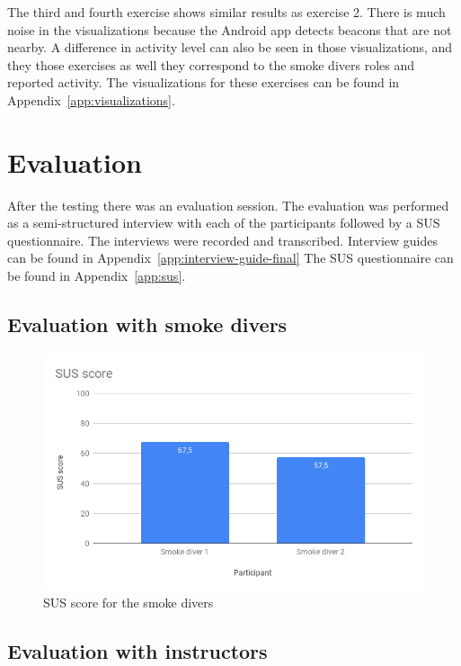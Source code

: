 \documentclass[../Main/thesis.tex]{subfiles}
\begin{document}
The third and fourth exercise shows similar results as exercise 2.
There is much noise in the visualizations because the Android app detects beacons that are not nearby.
A difference in activity level can also be seen in those visualizations, and they those exercises as well they correspond to the smoke divers roles and reported activity.
The visualizations for these exercises can be found in Appendix~\ref{app:visualizations}.

\section{Evaluation}
After the testing there was an evaluation session.
The evaluation was performed as a semi-structured interview with each of the participants followed by a SUS questionnaire.
The interviews were recorded and transcribed.
Interview guides can be found in Appendix~\ref{app:interview-guide-final}
The SUS questionnaire can be found in Appendix~\ref{app:sus}.

\subsection{Evaluation with smoke divers}

\begin{figure}
	\centering
	\includegraphics[width=\textwidth]{../fig/sus-smoke-divers.png}
	\caption{SUS score for the smoke divers}
	\label{fig:sus-smoke-divers}
\end{figure}

\subsection{Evaluation with instructors}
\end{document}
